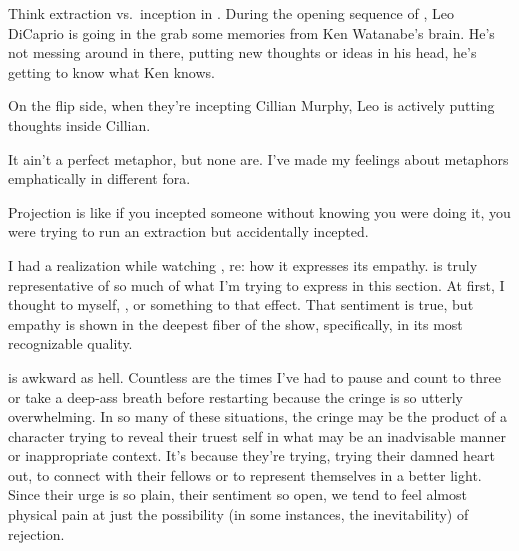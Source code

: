 \documentclass[../butidigress.tex]{subfiles}
\begin{document}
Think extraction vs.\ inception in .
During the opening sequence of , Leo DiCaprio is going in the grab some memories from Ken Watanabe's brain.
He's not messing around in there, putting new thoughts or ideas in his head, he's getting to know what Ken knows.

On the flip side, when they're incepting Cillian Murphy, Leo is actively putting thoughts inside Cillian.

It ain't a perfect metaphor, but none are. I've made my feelings about metaphors emphatically in different fora.

Projection is like if you incepted someone without knowing you were doing it, you were trying to run an extraction but accidentally incepted.

I had a realization while watching , re: how it expresses its empathy.
 is truly representative of so much of what I'm trying to express in this section.
At first, I thought to myself, , or something to that effect.
That sentiment is true, but empathy is shown in the deepest fiber of the show, specifically, in its most recognizable quality.

 is awkward as hell.
Countless are the times I've had to pause and count to three or take a deep-ass breath before restarting because the cringe is so utterly overwhelming.
In so many of these situations, the cringe may be the product of a character trying to reveal their truest self in what may be an inadvisable manner or inappropriate context.
It's because they're trying, trying their damned heart out, to connect with their fellows or to represent themselves in a better light.
Since their urge is so plain, their sentiment so open, we tend to feel almost physical pain at just the possibility (in some instances, the inevitability) of rejection.
\end{document}
